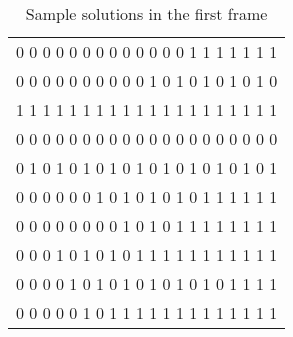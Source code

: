 \begin{table}[h!]
\centering
\begin{tabular}{l}
0	0	0	0	0	0	0	0	0	0	0	0	0	1	1	1	1	1	1	1 \\
0	0	0	0	0	0	0	0	0	0	1	0	1	0	1	0	1	0	1	0 \\
1	1	1	1	1	1	1	1	1	1	1	1	1	1	1	1	1	1	1	1 \\
0	0	0	0	0	0	0	0	0	0	0	0	0	0	0	0	0	0	0	0 \\
0	1	0	1	0	1	0	1	0	1	0	1	0	1	0	1	0	1	0	1 \\
0	0	0	0	0	0	1	0	1	0	1	0	1	0	1	1	1	1	1	1 \\
0	0	0	0	0	0	0	0	1	0	1	0	1	1	1	1	1	1	1	1 \\
0	0	0	1	0	1	0	1	0	1	1	1	1	1	1	1	1	1	1	1 \\
0	0	0	0	1	0	1	0	1	0	1	0	1	0	1	0	1	1	1	1 \\
0	0	0	0	0	1	0	1	1	1	1	1	1	1	1	1	1	1	1	1 \\
\end{tabular}
\caption{Sample solutions in the first frame}
\end{table}
